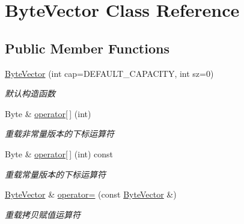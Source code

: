 \hypertarget{class_byte_vector}{}\section{Byte\+Vector Class Reference}
\label{class_byte_vector}
\subsection*{Public Member Functions}
\begin{DoxyCompactItemize}
\item 
\mbox{\label{class_byte_vector_a16e667346401dc6d6b6c87df40274ae4}} 
\mbox{\hyperlink{class_byte_vector_a16e667346401dc6d6b6c87df40274ae4}{Byte\+Vector}} (int cap=D\+E\+F\+A\+U\+L\+T\+\_\+\+C\+A\+P\+A\+C\+I\+TY, int sz=0)
\begin{DoxyCompactList}\small\item\em 默认构造函数 \end{DoxyCompactList}\item 
\mbox{\label{class_byte_vector_a3446e40a63bb3e794791d27aea11030f}} 
Byte \& \mbox{\hyperlink{class_byte_vector_a3446e40a63bb3e794791d27aea11030f}{operator\mbox{[}$\,$\mbox{]}}} (int)
\begin{DoxyCompactList}\small\item\em 重载非常量版本的下标运算符 \end{DoxyCompactList}\item 
\mbox{\label{class_byte_vector_a3ce736c7bda64deda1b4e6801f68bc80}} 
Byte \& \mbox{\hyperlink{class_byte_vector_a3ce736c7bda64deda1b4e6801f68bc80}{operator\mbox{[}$\,$\mbox{]}}} (int) const
\begin{DoxyCompactList}\small\item\em 重载常量版本的下标运算符 \end{DoxyCompactList}\item 
\mbox{\label{class_byte_vector_ac5539983b6c6de6ef4c20811b827a624}} 
\mbox{\hyperlink{class_byte_vector}{Byte\+Vector}} \& \mbox{\hyperlink{class_byte_vector_ac5539983b6c6de6ef4c20811b827a624}{operator=}} (const \mbox{\hyperlink{class_byte_vector}{Byte\+Vector}} \&)
\begin{DoxyCompactList}\small\item\em 重载拷贝赋值运算符 \end{DoxyCompactList}\item 

\end{DoxyCompactItemize}
